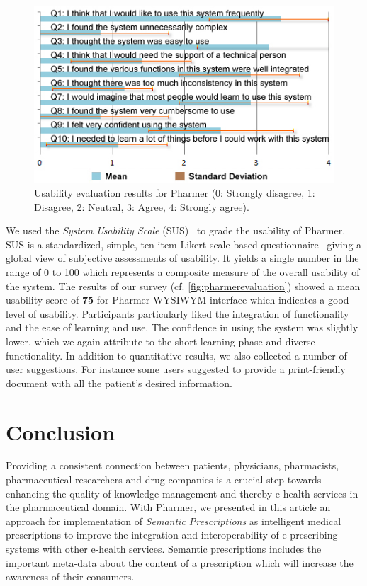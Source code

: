 \documentclass[10pt, conference, compsocconf]{IEEEtran}
\begin{document}
\begin{figure}[tb]
	\centering
		\includegraphics[width=1\columnwidth]{images/pharmer_evaluation.jpg}
	\caption{Usability evaluation results for Pharmer (0: Strongly disagree, 1: Disagree, 2: Neutral, 3: Agree, 4: Strongly agree).}
	\label{fig:pharmerevaluation}
\end{figure}
We used the \emph{System Usability Scale} (SUS)~\cite{SUS2009} to grade the usability of Pharmer.
SUS is a standardized, simple, ten-item Likert scale-based questionnaire~\cite{sus} giving a global view of subjective assessments of usability.
It yields a single number in the range of 0 to 100 which represents a composite measure of the overall usability of the system.
The results of our survey (cf. \autoref{fig:pharmerevaluation}) showed a mean usability score of \textbf{75} for Pharmer WYSIWYM interface which indicates a good level of usability.
Participants particularly liked the integration of functionality and the ease of learning and use.
The confidence in using the system was slightly lower, which we again attribute to the short learning phase and diverse functionality.
In addition to quantitative results, we also collected a number of user suggestions.
For instance some users suggested to provide a print-friendly document with all the patient's desired information.


\section{Conclusion}
\label{sec:conclusion}
Providing a consistent connection between patients, physicians, pharmacists, pharmaceutical researchers and drug companies is a crucial step towards enhancing the quality of knowledge management and thereby e-health services in the pharmaceutical domain.
With Pharmer, we presented in this article an approach for implementation of \emph{Semantic Prescriptions} as intelligent medical prescriptions to improve the integration and interoperability of e-prescribing systems with other e-health services.
Semantic prescriptions includes the important meta-data about the content of a prescription which will increase the awareness of their consumers.
\end{document}
